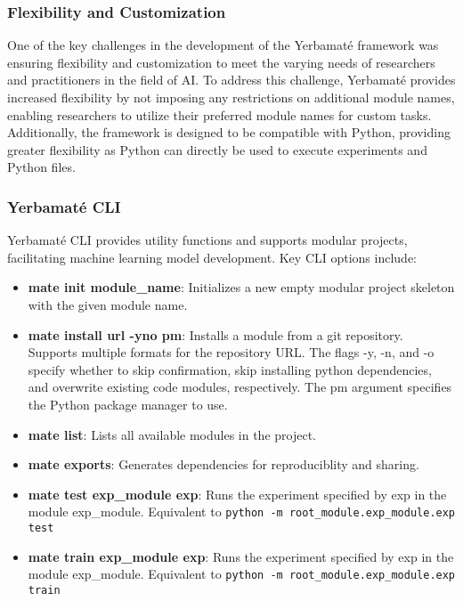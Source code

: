 \subsubsection{Flexibility and Customization}

One of the key challenges in the development of the Yerbamaté framework was ensuring flexibility and customization to meet the varying needs of researchers and practitioners in the field of AI. To address this challenge, Yerbamaté provides increased flexibility by not imposing any restrictions on additional module names, enabling researchers to utilize their preferred module names for custom tasks. 
Additionally, the framework is designed to be compatible with Python, providing greater flexibility as Python can directly be used to execute experiments and Python files.


\subsubsection{Yerbamaté CLI}
Yerbamaté CLI provides utility functions and supports modular projects, facilitating machine learning model development. Key CLI options include:

\begin{itemize}
\item \textbf{mate init module\_name}: Initializes a new empty modular project skeleton with the given module name. 

\item \textbf{mate install url -y\textbar n\textbar o pm}: Installs a module from a git repository. Supports multiple formats for the repository URL. The flags -y, -n, and -o specify whether to skip confirmation, skip installing python dependencies, and overwrite existing code modules, respectively. The pm argument specifies the Python package manager to use.
\item \textbf{mate list}: Lists all available modules in the project. 
\item \textbf{mate exports}: Generates dependencies for reproduciblity and sharing.
\item \textbf{mate test exp\_module exp}: Runs the experiment specified by exp in the module exp\_module. Equivalent to \texttt{python -m root\_module.exp\_module.exp test}
\item \textbf{mate train exp\_module exp}: Runs the experiment specified by exp in the module exp\_module. Equivalent to \texttt{python -m root\_module.exp\_module.exp train}
\end{itemize}


